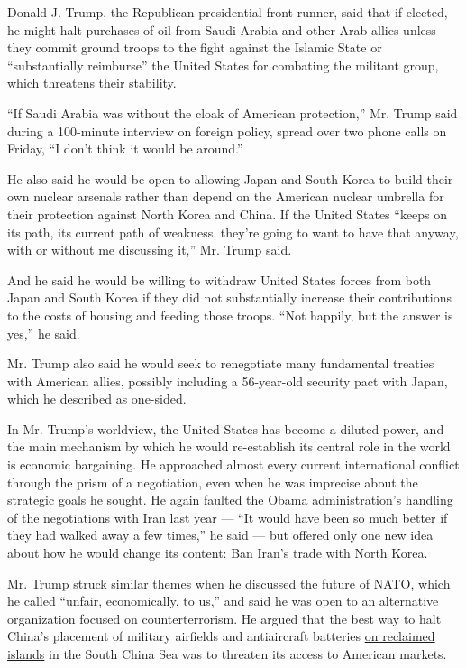 Donald J. Trump, the Republican presidential front-runner, said that if
elected, he might halt purchases of oil from Saudi Arabia and other Arab
allies unless they commit ground troops to the fight against the Islamic
State or ``substantially reimburse'' the United States for combating the
militant group, which threatens their stability.

``If Saudi Arabia was without the cloak of American protection,'' Mr.
Trump said during a 100-minute interview on foreign policy, spread over
two phone calls on Friday, ``I don't think it would be around.''

He also said he would be open to allowing Japan and South Korea to build
their own nuclear arsenals rather than depend on the American nuclear
umbrella for their protection against North Korea and China. If the
United States ``keeps on its path, its current path of weakness, they're
going to want to have that anyway, with or without me discussing it,''
Mr. Trump said.

And he said he would be willing to withdraw United States forces from
both Japan and South Korea if they did not substantially increase their
contributions to the costs of housing and feeding those troops. ``Not
happily, but the answer is yes,'' he said.

Mr. Trump also said he would seek to renegotiate many fundamental
treaties with American allies, possibly including a 56-year-old security
pact with Japan, which he described as one-sided.

In Mr. Trump's worldview, the United States has become a diluted power,
and the main mechanism by which he would re-establish its central role
in the world is economic bargaining. He approached almost every current
international conflict through the prism of a negotiation, even when he
was imprecise about the strategic goals he sought. He again faulted the
Obama administration's handling of the negotiations with Iran last year
--- ``It would have been so much better if they had walked away a few
times,'' he said --- but offered only one new idea about how he would
change its content: Ban Iran's trade with North Korea.

Mr. Trump struck similar themes when he discussed the future of NATO,
which he called ``unfair, economically, to us,'' and said he was open to
an alternative organization focused on counterterrorism. He argued that
the best way to halt China's placement of military airfields and
antiaircraft batteries
\href{http://www.nytimes3xbfgragh.onion/interactive/2015/07/30/world/asia/what-china-has-been-building-in-the-south-china-sea-2016.html}{on
reclaimed islands} in the South China Sea was to threaten its access to
American markets.

